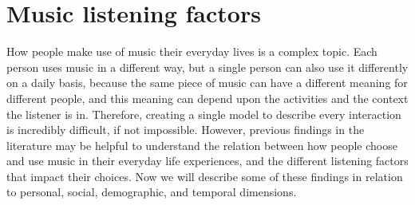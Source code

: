 \section{Music listening factors}\label{section:music-listening-factors}
How people make use of music their everyday lives is a complex topic. 
Each person uses music in a different way, but a single person can also use it differently on a daily basis, because the same piece of music can have a different meaning for different people, and this meaning can depend upon the activities and the context the listener is in.
Therefore, creating a single model to describe every interaction is incredibly difficult, if not impossible. 
However, previous findings in the literature may be helpful to understand the relation between how people choose and use music in their everyday life experiences, and the different listening factors that impact their choices. 
Now we will describe some of these findings in relation to personal, social, demographic, and temporal dimensions.




